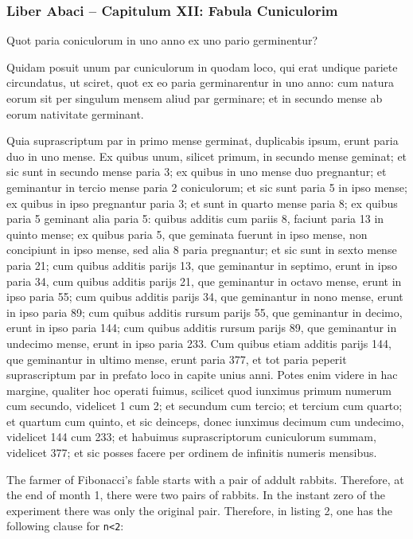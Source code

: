 \documentclass[
  12pt,
]{book}
\begin{document}
\subsubsection*{Liber Abaci -- Capitulum XII: Fabula
Cuniculorim}\label{Liber}

Quot paria coniculorum in uno anno ex uno pario germinentur?

Quidam posuit unum par cuniculorum in quodam loco, qui erat undique
pariete circundatus, ut sciret, quot ex eo paria germinarentur in uno
anno: cum natura eorum sit per singulum mensem aliud par germinare; et
in secundo mense ab eorum nativitate germinant.

Quia suprascriptum par in primo mense germinat, duplicabis ipsum, erunt
paria duo in uno mense. Ex quibus unum, silicet primum, in secundo mense
geminat; et sic sunt in secundo mense paria 3; ex quibus in uno mense
duo pregnantur; et geminantur in tercio mense paria 2 coniculorum; et
sic sunt paria 5 in ipso mense; ex quibus in ipso pregnantur paria 3; et
sunt in quarto mense paria 8; ex quibus paria 5 geminant alia paria 5:
quibus additis cum pariis 8, faciunt paria 13 in quinto mense; ex quibus
paria 5, que geminata fuerunt in ipso mense, non concipiunt in ipso
mense, sed alia 8 paria pregnantur; et sic sunt in sexto mense paria 21;
cum quibus additis parijs 13, que geminantur in septimo, erunt in ipso
paria 34, cum quibus additis parijs 21, que geminantur in octavo mense,
erunt in ipso paria 55; cum quibus additis parijs 34, que geminantur in
nono mense, erunt in ipso paria 89; cum quibus additis rursum parijs 55,
que geminantur in decimo, erunt in ipso paria 144; cum quibus additis
rursum parijs 89, que geminantur in undecimo mense, erunt in ipso paria
233. Cum quibus etiam additis parijs 144, que geminantur in ultimo
mense, erunt paria 377, et tot paria peperit suprascriptum par in
prefato loco in capite unius anni. Potes enim videre in hac margine,
qualiter hoc operati fuimus, scilicet quod iunximus primum numerum cum
secundo, videlicet 1 cum 2; et secundum cum tercio; et tercium cum
quarto; et quartum cum quinto, et sic deinceps, donec iunximus decimum
cum undecimo, videlicet 144 cum 233; et habuimus suprascriptorum
cuniculorum summam, videlicet 377; et sic posses facere per ordinem de
infinitis numeris mensibus.

The farmer of Fibonacci's fable starts with a pair of addult rabbits.
Therefore, at the end of month 1, there were two pairs of rabbits. In
the instant zero of the experiment there was only the original pair.
Therefore, in listing 2, one has the following clause for
\texttt{n\textless{}2}:
\end{document}
